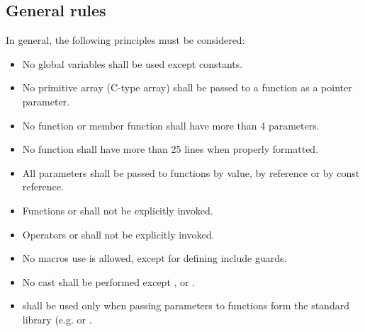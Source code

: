 \subsection{General rules}

In general, the following principles must be considered:

\begin{itemize}

\item No global variables shall be used except constants.

\item No primitive array (C-type array) shall be passed to 
a function as a pointer parameter.

\item No function or member function shall have more than 4 parameters.

\item No function shall have more than 25 lines when properly formatted.

\item All parameters shall be passed to functions by value, by reference
or by const reference.

\item Functions  or  shall not be explicitly invoked.

\item Operators  or  shall not be explicitly invoked.

\item No macros use is allowed, except for defining include guards.

\item No cast shall be performed except
,  or .

\item {} shall be used only when passing parameters
to functions form the standard library (e.g.  or .

\end{itemize}
